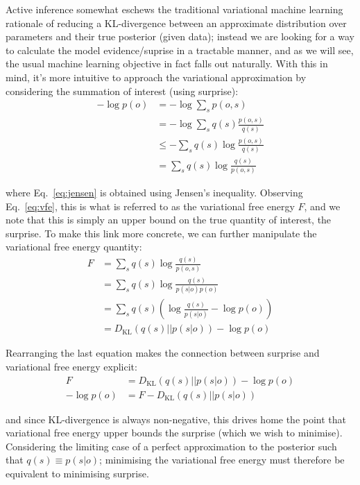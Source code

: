\documentclass{article}
\newcommand{\KL}{\text{KL}}
\begin{document}
Active inference somewhat eschews the traditional variational machine learning rationale of reducing a KL-divergence between an approximate distribution over parameters and their true posterior (given data); instead we are looking for a way to calculate the model evidence/suprise in a tractable manner, and as we will see, the usual machine learning objective in fact falls out naturally. With this in mind, it's more intuitive to approach the variational approximation by considering the summation of interest (using surprise):
\begin{align}
    -\log p(o) &= - \log \sum_s p(o,s)\\
                &= - \log \sum_s q(s) \frac{p(o,s)}{q(s)}\\
                &\leq - \sum_s q(s) \log \frac{p(o,s)}{q(s)} \label{eq:jensen}\\
                &= \sum_s q(s) \log \frac{q(s)}{p(o,s)} \label{eq:vfe}
\end{align}

where Eq.\ \ref{eq:jensen} is obtained using Jensen's inequality. Observing Eq.\ \ref{eq:vfe}, this is what is referred to as the variational free energy $F$, and we note that this is simply an upper bound on the true quantity of interest, the surprise. To make this link more concrete, we can further manipulate the variational free energy quantity:
\begin{align}
    F &= \sum_s q(s) \log \frac{q(s)}{p(o,s)}\\
      &= \sum_s q(s) \log \frac{q(s)}{p(s|o)p(o)}\\
      &= \sum_s q(s) \left( \log \frac{q(s)}{p(s|o)} - \log p(o)\right)\\
      &= D_\KL(q(s)||p(s|o)) - \log p(o)
\end{align}

Rearranging the last equation makes the connection between surprise and variational free energy explicit:
\begin{align}
    F &= D_\KL(q(s)||p(s|o)) - \log p(o) \label{eq:vfe2}\\
    - \log p(o) &= F - D_\KL(q(s)||p(s|o))
\end{align}

and since KL-divergence is always non-negative, this drives home the point that variational free energy upper bounds the surprise (which we wish to minimise). Considering the limiting case of a perfect approximation to the posterior such that $q(s) \equiv p(s|o)$; minimising the variational free energy must therefore be equivalent to minimising surprise.
\end{document}
